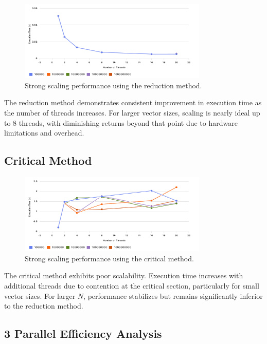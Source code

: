 \documentclass[unicode,11pt,a4paper,oneside,numbers=endperiod,openany]{scrartcl}
\begin{document}
\begin{figure}[h]
    \centering
    \includegraphics[width=0.8\textwidth]{./figures/Figure 1: Strong Scaling - Reduction Method.png}
    \caption{Strong scaling performance using the reduction method.}
\end{figure}

The reduction method demonstrates consistent improvement in execution time as the number of threads increases. For larger vector sizes, scaling is nearly ideal up to 8 threads, with diminishing returns beyond that point due to hardware limitations and overhead.

\subsection*{Critical Method}

\begin{figure}[h]
    \centering
    \includegraphics[width=0.8\textwidth]{./figures/Figure 2: Strong Scaling - Critical Method.png}
    \caption{Strong scaling performance using the critical method.}
\end{figure}

The critical method exhibits poor scalability. Execution time increases with additional threads due to contention at the critical section, particularly for small vector sizes. For larger $N$, performance stabilizes but remains significantly inferior to the reduction method.

\newpage
\subsection*{3 Parallel Efficiency Analysis}
\end{document}
